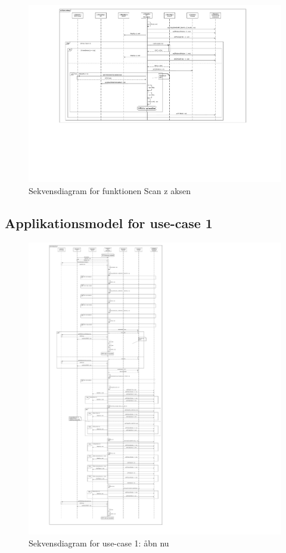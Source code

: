 \begin{figure}[H]
	\caption{Sekvensdiagram for funktionen Scan z aksen}
	\label{SD:PSoC:ScanZ}
	\includegraphics[scale=0.29,trim=200 100 0 0, clip]{APPSoC/SD-Scan-z-aksen}
\end{figure}

\subsection{Applikationsmodel for use-case 1}

\begin{figure}[H]
	\caption{Sekvensdiagram for use-case 1: åbn nu}
	\label{SD:PSoC:UC1}
	\includegraphics[scale=0.2,trim=0 0 0 0, clip]{APPSoC/UC1-Aaben-nu-v1-simplified}
\end{figure}

